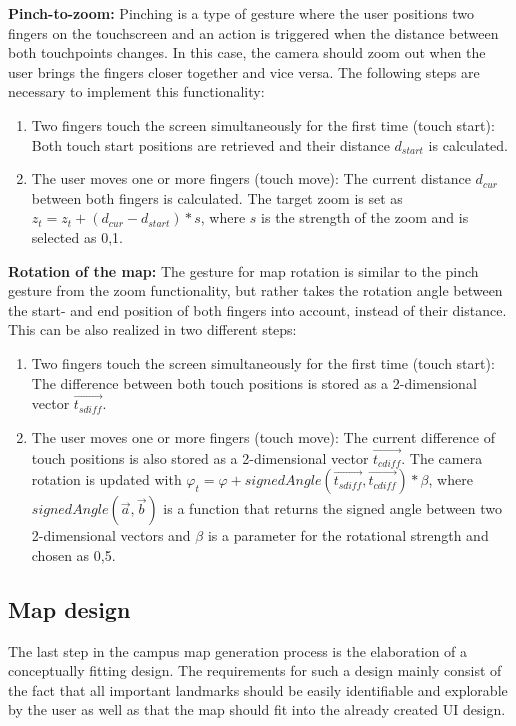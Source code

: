 \textbf{Pinch-to-zoom:} Pinching is a type of gesture where the user positions two fingers on the touchscreen and an action is triggered when the distance between both touchpoints changes. In this case, the camera should zoom out when the user brings the fingers closer together and vice versa. The following steps are necessary to implement this functionality:

\begin{enumerate}
	\item Two fingers touch the screen simultaneously for the first time (touch start): Both touch start positions are retrieved and their distance $d_{start}$ is calculated.
	\item The user moves one or more fingers (touch move): The current distance $d_{cur}$ between both fingers is calculated. The target zoom is set as $z_{t} = z_{t} + (d_{cur} - d_{start}) * s$, where $s$ is the strength of the zoom and is selected as 0,1.
\end{enumerate}

\textbf{Rotation of the map:} The gesture for map rotation is similar to the pinch gesture from the zoom functionality, but rather takes the rotation angle between the start- and end position of both fingers into account, instead of their distance. This can be also realized in two different steps:

\begin{enumerate}
	\item Two fingers touch the screen simultaneously for the first time (touch start): The difference between both touch positions is stored as a 2-dimensional vector $\overrightarrow{t_{sdiff}}$.
	\item  The user moves one or more fingers (touch move): The current difference of touch positions is also stored as a 2-dimensional vector $\overrightarrow{t_{cdiff}}$. The camera rotation is updated with $\varphi_{t} = \varphi + signedAngle(\overrightarrow{t_{sdiff}}, \overrightarrow{t_{cdiff}}) * \beta$, where $signedAngle(\overrightarrow{a}, \overrightarrow{b})$ is a function that returns the signed angle between two 2-dimensional vectors and $\beta$ is a parameter for the rotational strength and chosen as 0,5.
\end{enumerate}

\subsection{Map design}
The last step in the campus map generation process is the elaboration of a conceptually fitting design. The requirements for such a design mainly consist of the fact that all important landmarks should be easily identifiable and explorable by the user as well as that the map should fit into the already created UI design.

